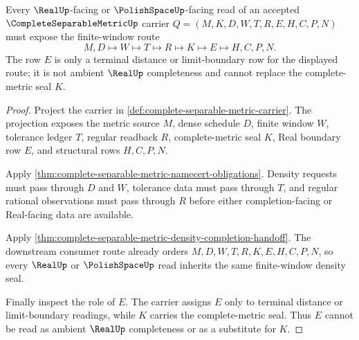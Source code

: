 \begin{theorem}\label{thm:complete-separable-metric-finite-window-density-seal}
Every $\RealUp$-facing or $\PolishSpaceUp$-facing read of an accepted $\CompleteSeparableMetricUp$ carrier $Q=(M,K,D,W,T,R,E,H,C,P,N)$ must expose the finite-window route
$$
M,D \longmapsto W \longmapsto T \longmapsto R \longmapsto K \longmapsto E \longmapsto H,C,P,N .
$$
The row $E$ is only a terminal distance or limit-boundary row for the displayed route; it is not ambient $\RealUp$ completeness and cannot replace the complete-metric seal $K$.
\end{theorem}
\begin{proof}
Project the carrier in \autoref{def:complete-separable-metric-carrier}. The projection exposes the metric source $M$, dense schedule $D$, finite window $W$, tolerance ledger $T$, regular readback $R$, complete-metric seal $K$, Real boundary row $E$, and structural rows $H,C,P,N$.

Apply \autoref{thm:complete-separable-metric-namecert-obligations}. Density requests must pass through $D$ and $W$, tolerance data must pass through $T$, and regular rational observations must pass through $R$ before either completion-facing or Real-facing data are available.

Apply \autoref{thm:complete-separable-metric-density-completion-handoff}. The downstream consumer route already orders $M,D,W,T,R,K,E,H,C,P,N$, so every $\RealUp$ or $\PolishSpaceUp$ read inherits the same finite-window density seal.

Finally inspect the role of $E$. The carrier assigns $E$ only to terminal distance or limit-boundary readings, while $K$ carries the complete-metric seal. Thus $E$ cannot be read as ambient $\RealUp$ completeness or as a substitute for $K$.
\end{proof}

